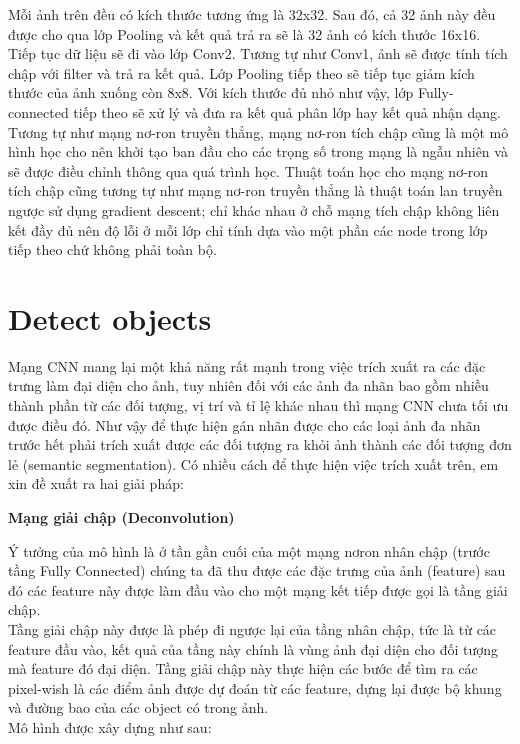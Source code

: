 \documentclass[13pt, a4paper]{extreport}
\begin{document}
\indent Mỗi ảnh trên đều có kích thước tương ứng là 32x32. Sau đó, cả 32 ảnh này đều được cho qua lớp Pooling và kết quả trả ra sẽ là 32 ảnh có kích thước 16x16.\\
\indent Tiếp tục dữ liệu sẽ đi vào lớp Conv2. Tương tự như Conv1, ảnh sẽ được tính tích chập với filter và trả ra kết quả. Lớp Pooling tiếp theo sẽ tiếp tục giảm kích thước của ảnh xuống còn 8x8. Với kích thước đủ nhỏ như vậy, lớp Fully-connected tiếp theo sẽ xử lý và đưa ra kết quả phân lớp hay kết quả nhận dạng.\\
\indent Tương tự như mạng nơ-ron truyền thẳng, mạng nơ-ron tích chập cũng là một mô hình học cho nên khởi tạo ban đầu cho các trọng số trong mạng là ngẫu nhiên và sẽ được điều chỉnh thông qua quá trình học. Thuật toán học cho mạng nơ-ron tích chập cũng tương tự như mạng nơ-ron truyền thẳng là thuật toán lan truyền ngược sử dụng gradient descent; chỉ khác nhau ở chỗ mạng tích chập không liên kết đầy đủ nên độ lỗi ở mỗi lớp chỉ tính dựa vào một phần các node trong lớp tiếp theo chứ không phải toàn bộ.
\section{Detect objects}
\indent Mạng CNN mang lại một khả năng rất mạnh trong việc trích xuất ra các đặc trưng làm đại diện cho ảnh, tuy nhiên đối với các ảnh đa nhãn bao gồm nhiều thành phần từ các đối tượng, vị trí và tỉ lệ khác nhau thì mạng CNN chưa tối ưu được điều đó. Như vậy để thực hiện gán nhãn được cho các loại ảnh đa nhãn trước hết phải trích xuất được các đối tượng ra khỏi ảnh thành các đối tượng đơn lẻ (semantic segmentation). Có nhiều cách để thực hiện việc trích xuất trên, em xin đề xuất ra hai giải pháp:

\vspace{0.15cm}
\indent \textbf{Mạng giải chập (Deconvolution)}

\vspace{0.15cm}
\indent Ý tưởng của mô hình là ở tần gần cuối của một mạng nơron nhân chập (trước tầng Fully Connected) chúng ta đã thu được các đặc trưng của ảnh (feature) sau đó các feature này được làm đầu vào cho một mạng kết tiếp được gọi là tầng giải chập. \\
\indent Tầng giải chập này được là phép đi ngược lại của tầng nhân chập, tức là từ các feature đầu vào, kết quả của tầng này chính là vùng ảnh đại diện cho đối tượng mà feature đó đại diện. Tầng giải chập này thực hiện các bước để tìm ra các pixel-wish là các điểm ảnh được dự đoán từ các feature, dựng lại được bộ khung và đường bao của các object có trong ảnh.\\
\indent Mô hình được xây dựng như sau:
\end{document}
